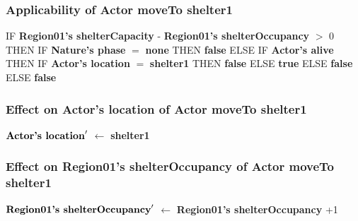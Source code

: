 \documentclass{article}%
\begin{document}
%
\subsubsection{Applicability of Actor moveTo shelter1}%
\label{ssubsec:Applicability of Actor moveTo shelter1}%
\begin{flushleft}%
IF %
\textbf{Region01's shelterCapacity}%
{-}%
\textbf{Region01's shelterOccupancy}%
$>$%
0%
\linebreak%
\hspace*{2em}%
THEN %
IF %
\textbf{Nature's phase}%
$=$%
\textbf{none}%
\linebreak%
\hspace*{4em}%
THEN %
\textbf{false}%
\linebreak%
\hspace*{4em}%
ELSE %
IF %
\textbf{Actor's alive}%
\linebreak%
\hspace*{6em}%
THEN %
IF %
\textbf{Actor's location}%
$=$%
\textbf{shelter1}%
\linebreak%
\hspace*{8em}%
THEN %
\textbf{false}%
\linebreak%
\hspace*{8em}%
ELSE %
\textbf{true}%
\linebreak%
\hspace*{6em}%
ELSE %
\textbf{false}%
\linebreak%
\hspace*{2em}%
ELSE %
\textbf{false}%
\end{flushleft}

%
\subsubsection{Effect on Actor's location of Actor moveTo shelter1}%
\label{ssubsec:Effect on Actor's location of Actor moveTo shelter1}%
\begin{flushleft}%
$\mbox{\textbf{Actor's location}} '$%
$\leftarrow$%
\textbf{shelter1}%
\end{flushleft}

%
\subsubsection{Effect on Region01's shelterOccupancy of Actor moveTo shelter1}%
\label{ssubsec:Effect on Region01's shelterOccupancy of Actor moveTo shelter1}%
\begin{flushleft}%
$\mbox{\textbf{Region01's shelterOccupancy}} '$%
$\leftarrow$%
\textbf{Region01's shelterOccupancy}%
+1%
\end{flushleft}
\end{document}
